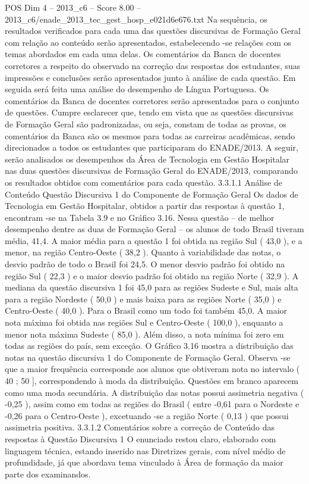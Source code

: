 \begin{textsample}{POS Dim 4 – 2013\_c6 – Score 8.00 – 2013\_c6/enade\_2013\_tec\_gest\_hosp\_e021d6e676.txt}
Na sequência, os resultados verificados para cada uma das questões discursivas de Formação Geral com relação ao conteúdo serão apresentados, estabelecendo -se relações com os temas abordados em cada uma delas.
Os comentários da Banca de docentes corretores a respeito do observado na correção das respostas dos estudantes, suas impressões e conclusões serão apresentados junto à análise de cada questão.
Em seguida será feita uma análise do desempenho de Língua Portuguesa.
Os comentários da Banca de docentes corretores serão apresentados para o conjunto de questões.
Cumpre esclarecer que, tendo em vista que as questões discursivas de Formação Geral são padronizadas, ou seja, constam de todas as provas, os comentários da Banca são os mesmos para todas as carreiras acadêmicas, sendo direcionados a todos os estudantes que participaram do ENADE/2013.
A seguir, serão analisados os desempenhos da Área de Tecnologia em Gestão Hospitalar nas duas questões discursivas de Formação Geral do ENADE/2013, comparando os resultados obtidos com comentários para cada questão. 3.3.1.1 Análise de Conteúdo Questão Discursiva 1 do Componente de Formação Geral Os dados de Tecnologia em Gestão Hospitalar, obtidos a partir das respostas à questão 1, encontram -se na Tabela 3.9 e no Gráfico 3.16.
Nessa questão – de melhor desempenho dentre as duas de Formação Geral – os alunos de todo Brasil tiveram média, 41,4.
A maior média para a questão 1 foi obtida na região Sul ( 43,0 ), e a menor, na região Centro-Oeste ( 38,2 ).
Quanto à variabilidade das notas, o desvio padrão de todo o Brasil foi 24,5.
O menor desvio padrão foi obtido na região Sul ( 22,3 ) e o maior desvio padrão foi obtido na região Norte ( 32,9 ).
A mediana da questão discursiva 1 foi 45,0 para as regiões Sudeste e Sul, mais alta para a região Nordeste ( 50,0 ) e mais baixa para as regiões Norte ( 35,0 ) e Centro-Oeste ( 40,0 ).
Para o Brasil como um todo foi também 45,0.
A maior nota máxima foi obtida nas regiões Sul e Centro-Oeste ( 100,0 ), enquanto a menor nota máxima Sudeste ( 85,0 ).
Além disso, a nota mínima foi zero em todas as regiões do país, sem exceção.
O Gráfico 3.16 mostra a distribuição das notas na questão discursiva 1 do Componente de Formação Geral.
Observa -se que a maior frequência corresponde aos alunos que obtiveram nota no intervalo ( 40 ; 50 ], correspondendo à moda da distribuição.
Questões em branco aparecem como uma moda secundária.
A distribuição das notas possui assimetria negativa ( -0,25 ), assim como em todas as regiões do Brasil ( entre -0,61 para o Nordeste e -0,26 para o Centro-Oeste ), excetuando -se a região Norte ( 0,13 ) que possui assimetria positiva. 3.3.1.2 Comentários sobre a correção de Conteúdo das respostas à Questão Discursiva 1 O enunciado restou claro, elaborado com linguagem técnica, estando inserido nas Diretrizes gerais, com nível médio de profundidade, já que abordava tema vinculado à Área de formação da maior parte dos examinandos.

\end{textsample}
